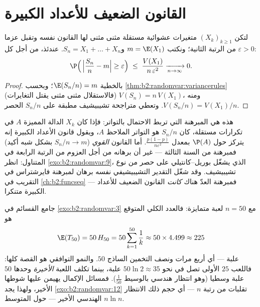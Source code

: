 \section{القانون الضعيف للأعداد الكبيرة}

\begin{theorem}\label{thm:b2:randomvar:lln}
لتكن $(X_k)_{k \geq 1}$ متغيرات عشوائية مستقلة مثنى مثنى لها القانون نفسه وتقبل
عزما من الرتبة الثانية؛ ونكتب $m = \E(X_1)$ و$S_n = X_1 + \dots + X_n$. عندئذ، من أجل كل
$\varepsilon > 0$:
\[
\P\Bigl(\,\Bigl|\frac{S_n}{n} - m\Bigr| \geq \varepsilon\Bigr)
\;\leq\; \frac{V(X_1)}{n\,\varepsilon^2}
\xrightarrow[n \to \infty]{} 0 .
\]
\end{theorem}

\begin{proof}
بالخطية $\E(S_n/n) = m$؛ وبحسب \cref{thm:b2:randomvar:variancerules} (فالاستقلال مثنى مثنى يقتل التغايرات)
$V(S_n) = n\,V(X_1)$، ومنه $V(S_n/n) =
V(X_1)/n$. وتعطي متراجحة تشيبيشيف مطبقة على $S_n/n$
الحصر.
\end{proof}

\begin{remark}
هذه هي المبرهنة التي تربط الاحتمال بالتواتر: فإذا كان $X_k$ الدالة
المميزة  $A$ في تكرارات مستقلة، كان $S_n/n$ هو التواتر
الملاحظ  $A$، ويقول قانون الأعداد الكبيرة إنه يتركز حول
$\P(A)$ بمعدل $\frac{p(1-p)}{n\varepsilon^2}$. أما القانون \emph{القوي} ($S_n/n \to
m$ بشكل شبه
أكيد) فمبرهنة من السنة الثالثة --- غير أن برهانه من أجل العزوم من
الرتبة الرابعة في المتناول: انظر \cref{exo:b2:randomvar:9}، الذي يشغّل بوريل--كانتيلي
على حصر من نوع تشيبيشيف. وقد شغّل التقدير التشيبيشيفي نفسه برهان
 لمبرهنة فايرشتراس في التقريب في \cref{ch:b2:funcseq} ---
فمبرهنة العدّ هناك \emph{كانت} القانون الضعيف للأعداد الكبيرة
متنكرا.
\end{remark}

\begin{example}
\label{ex:b2:randomvar:couponnumeric}
جامع القسائم في \cref{exo:b2:randomvar:3} مع $n =
50$ لعبة متمايزة: فالعدد الكلي المتوقع
هو
\[
\E(T_{50}) = 50\,H_{50} = 50\sum_{k=1}^{50}\frac1k
\approx 50 \times 4.499 \approx 225
\]
علبة --- أي أربع مرات ونصف التخمين الساذج $50$. والنمو التوافقي هو
القصة كلها: فاللعب $25$ الأولى تصل في نحو $50\ln2 \approx 35$ علبة، بينما
تكلف اللعبة \emph{الأخيرة} وحدها $50$ علبة وسطيا (وهو انتظار
هندسي بالوسيط $\frac1{50}$). فمسائل الإكمال يهيمن عليها شوطها الأخير،
ولهذا يجد \cref{exo:b2:randomvar:12} تقلبات من رتبة $n$ --- أي حجم ذلك الانتظار
الهندسي الأخير --- حول المتوسط $n\ln n$.
\end{example}

